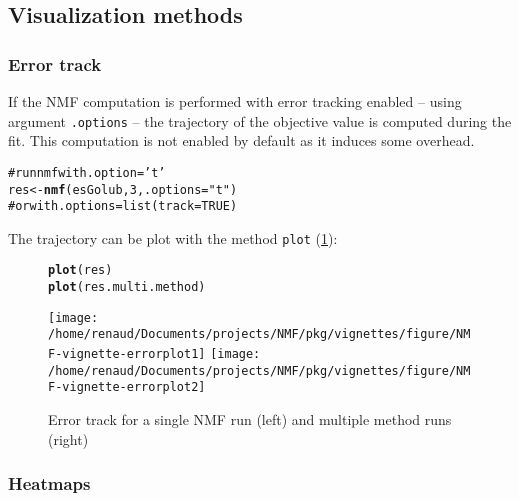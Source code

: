 \documentclass[a4paper]{article}\usepackage{graphicx, color}
\makeatletter
\newcommand{\hlfunctioncall}[1]{\textcolor[rgb]{0.501960784313725,0,0.329411764705882}{\textbf{#1}}}%
\newcommand{\hlstring}[1]{\textcolor[rgb]{0.6,0.6,1}{#1}}%
\newcommand{\hlcomment}[1]{\textcolor[rgb]{0.180392156862745,0.6,0.341176470588235}{#1}}%
\newenvironment{kframe}{%
 \def\at@end@of@kframe{}%
 \ifinner\ifhmode%
  \def\at@end@of@kframe{\end{minipage}}%
  \begin{minipage}{\columnwidth}%
 \fi\fi%
 \def\FrameCommand##1{\hskip\@totalleftmargin \hskip-\fboxsep
 \colorbox{shadecolor}{##1}\hskip-\fboxsep
     \hskip-\linewidth \hskip-\@totalleftmargin \hskip\columnwidth}%
 \MakeFramed {\advance\hsize-\width
   \@totalleftmargin\z@ \linewidth\hsize
   \@setminipage}}%
 {\par\unskip\endMakeFramed%
 \at@end@of@kframe}
\newenvironment{knitrout}{}{} %
\let\code=\texttt
\makeatother
\begin{document}
\subsection{Visualization methods}

\subsubsection*{Error track}

If the NMF computation is performed with error tracking enabled -- using argument \code{.options} -- the trajectory of the objective value is computed during the fit.
This computation is not enabled by default as it induces some overhead. 

\begin{knitrout}
\color{fgcolor}\begin{kframe}
\begin{alltt}
\hlcomment{# run nmf with .option='t'}
res <- \hlfunctioncall{nmf}(esGolub, 3, .options = \hlstring{"t"})
\hlcomment{# or with .options=list(track=TRUE)}
\end{alltt}
\end{kframe}
\end{knitrout}


The trajectory can be plot with the method \code{plot} (\cref{fig:errorplot}):
\begin{figure}[!htbp]
\begin{knitrout}
\color{fgcolor}\begin{kframe}
\begin{alltt}
\hlfunctioncall{plot}(res)
\hlfunctioncall{plot}(res.multi.method)
\end{alltt}
\end{kframe}
\texttt{[image: /home/renaud/Documents/projects/NMF/pkg/vignettes/figure/NMF-vignette-errorplot1]} 
\texttt{[image: /home/renaud/Documents/projects/NMF/pkg/vignettes/figure/NMF-vignette-errorplot2]} 

\end{knitrout}

\caption{Error track for a single NMF run (left) and multiple method
runs (right)}
\label{fig:errorplot}
\end{figure}

\subsubsection*{Heatmaps}
\end{document}
